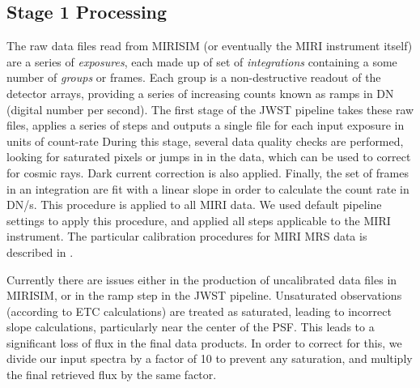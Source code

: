 \subsection{Stage 1 Processing}
The raw data files read from MIRISIM (or eventually the MIRI instrument itself) are a series of \textit{exposures}, each made up of set of \textit{integrations} containing a some number of \textit{groups} or frames.
Each group is a non-destructive readout of the detector arrays, providing a series of increasing counts known as ramps in DN (digital number per second). 
The first stage of the JWST pipeline takes these raw files, applies a series of steps and outputs a single file for each input exposure in units of count-rate
During this stage, several data quality checks are performed, looking for saturated pixels or jumps in in the data, which can be used to correct for cosmic rays.
Dark current correction is also applied.
Finally, the set of frames in an integration are fit with a linear slope in order to calculate the count rate in DN/s.
This procedure is applied to all MIRI data.
We used default pipeline settings to apply this procedure, and applied all steps applicable to the MIRI instrument.
The particular calibration procedures for MIRI MRS data is described in \parencite{ref:mirical}.

Currently there are issues either in the production of uncalibrated data files in MIRISIM, or in the ramp step in the JWST pipeline. 
Unsaturated observations (according to ETC calculations) are treated as saturated, leading to incorrect slope calculations, particularly near the center of the PSF. 
This leads to a significant loss of flux in the final data products.
In order to correct for this, we divide our input spectra by a factor of 10 to prevent any saturation, and multiply the final retrieved flux by the same factor.
